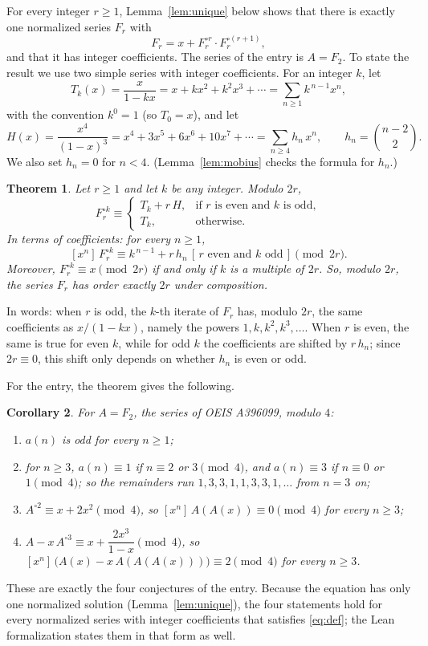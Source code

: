 \documentclass[11pt,a4paper]{article}
\newtheorem{theorem}{Theorem}[section]
\newtheorem{corollary}[theorem]{Corollary}
\theoremstyle{definition}
\theoremstyle{remark}
\newcommand{\coeff}[2]{[x^{#1}]\,#2}
\begin{document}
For every integer $r\ge1$, Lemma~\ref{lem:unique} below shows that there is exactly one normalized series $F_r$ with
\begin{equation}\label{eq:family}
F_r=x+F_r^{\circ r}\cdot F_r^{\circ(r+1)},
\end{equation}
and that it has integer coefficients. The series of the entry is $A=F_{2}$. To state the result we use
two simple series with integer coefficients. For an integer $k$, let
\[
T_k(x)=\frac{x}{1-kx}=x+kx^2+k^2x^3+\cdots=\sum_{n\ge1}k^{\,n-1}x^n ,
\]
with the convention $k^0=1$ (so $T_0=x$), and let
\[
H(x)=\frac{x^4}{(1-x)^3}=x^4+3x^5+6x^6+10x^7+\cdots=\sum_{n\ge4}h_n\,x^n,\qquad h_n=\binom{n-2}{2}.
\]
We also set $h_n=0$ for $n<4$. (Lemma~\ref{lem:mobius} checks the formula for $h_n$.)

\begin{theorem}\label{thm:general}
Let $r\ge1$ and let $k$ be any integer. Modulo $2r$,
\[
F_r^{\circ k}\equiv
\begin{cases}
T_k+r\,H, & \text{if $r$ is even and $k$ is odd},\\
T_k, & \text{otherwise}.
\end{cases}
\]
In terms of coefficients: for every $n\ge1$,
\[
\coeff{n}{F_r^{\circ k}}\equiv k^{\,n-1}+r\,h_n\,[\,r\text{ even and }k\text{ odd}\,]\pmod{2r}.
\]
Moreover, $F_r^{\circ k}\equiv x\pmod{2r}$ if and only if $k$ is a multiple of $2r$. So, modulo $2r$, the series $F_r$
has order exactly $2r$ under composition.
\end{theorem}

In words: when $r$ is odd, the $k$-th iterate of $F_r$ has, modulo $2r$, the same coefficients as $x/(1-kx)$,
namely the powers $1,k,k^2,k^3,\dots$. When $r$ is even, the same is true for even $k$, while for odd $k$ the
coefficients are shifted by $r\,h_n$; since $2r\equiv0$, this shift only depends on whether $h_n$ is even or odd.

For the entry, the theorem gives the following.

\begin{corollary}\label{cor:app}
For $A=F_2$, the series of OEIS A396099, modulo $4$:
\begin{enumerate}[label=(\alph*)]
\item $a(n)$ is odd for every $n\ge1$;
\item for $n\ge3$, $a(n)\equiv1$ if $n\equiv2$ or $3\pmod4$, and $a(n)\equiv3$ if $n\equiv0$ or $1\pmod4$; so the
remainders run $1,3,3,1,1,3,3,1,\dots$ from $n=3$ on;
\item $A^{\circ2}\equiv x+2x^2\pmod4$, so $\coeff{n}{A(A(x))}\equiv0\pmod4$ for every $n\ge3$;
\item $A-x\,A^{\circ3}\equiv x+\dfrac{2x^3}{1-x}\pmod4$, so $\coeff{n}{\bigl(A(x)-x\,A(A(A(x)))\bigr)}\equiv2\pmod4$
for every $n\ge3$.
\end{enumerate}
\end{corollary}
These are exactly the four conjectures of the entry. Because the equation has only one normalized solution
(Lemma~\ref{lem:unique}), the four statements hold for every normalized series with integer coefficients that
satisfies \eqref{eq:def}; the Lean formalization states them in that form as well.
\end{document}
